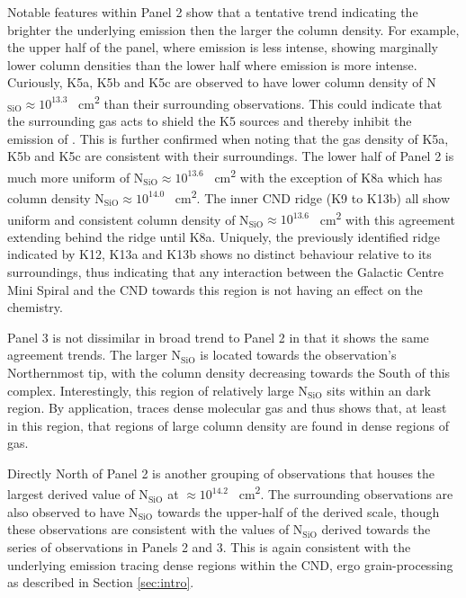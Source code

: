 \documentclass[twocolumn]{aastex631}
\begin{document}
Notable features within Panel 2 show that a tentative trend indicating the brighter the underlying  emission then the larger the  column density. For example, the upper half of the panel, where  emission is less intense, showing marginally lower column densities than the lower half where  emission is more intense. Curiously, K5a, K5b and K5c are observed to have lower column density of N$_{\mathrm{SiO}} \approx 10^{13.3}$ \si{\per\centi\meter\squared} than their surrounding observations. This could indicate that the surrounding gas acts to shield the K5 sources and thereby inhibit the emission of . This is further confirmed when noting that the gas density of K5a, K5b and K5c are consistent with their surroundings. The lower half of Panel 2 is much more uniform of N$_{\mathrm{SiO}} \approx 10^{13.6}$ \si{\per\centi\meter\squared} with the exception of K8a which has column density N$_{\mathrm{SiO}} \approx 10^{14.0}$ \si{\per\centi\meter\squared}. The inner CND ridge (K9 to K13b) all show uniform and consistent column density of N$_{\mathrm{SiO}} \approx 10^{13.6}$ \si{\per\centi\meter\squared} with this agreement extending behind the ridge until K8a. Uniquely, the previously identified ridge indicated by K12, K13a and K13b shows no distinct  behaviour relative to its surroundings, thus indicating that any interaction between the Galactic Centre Mini Spiral and the CND towards this region is not having an effect on the  chemistry.

Panel 3 is not dissimilar in broad trend to Panel 2 in that it shows the same agreement trends. The larger N$_{\mathrm{SiO}}$ is located towards the observation's Northernmost tip, with the column density decreasing towards the South of this complex. Interestingly, this region of relatively large N$_{\mathrm{SiO}}$ sits within an  dark region. By application,  traces dense molecular gas and thus shows that, at least in this region, that regions of large  column density are found in dense regions of gas.

Directly North of Panel 2 is another grouping of observations that houses the largest derived value of N$_{\mathrm{SiO}}$ at $\approx 10^{14.2}$ \si{\per\centi\meter\squared}. The surrounding observations are also observed to have N$_{\mathrm{SiO}}$ towards the upper-half of the derived scale, though these observations are consistent with the values of N$_{\mathrm{SiO}}$ derived towards the series of observations in Panels 2 and 3. This is again consistent with the underlying  emission tracing dense regions within the CND, ergo grain-processing as described in Section \ref{sec:intro}.
\end{document}
